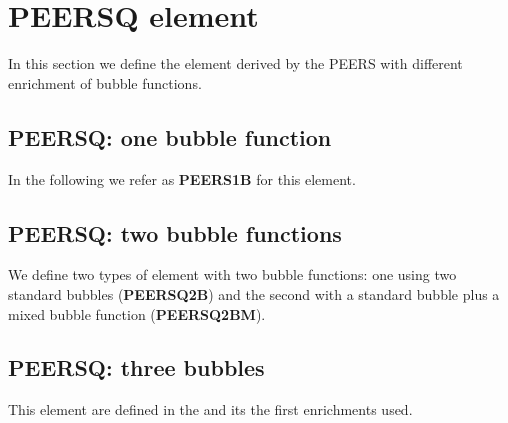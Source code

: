 \section{PEERSQ element}
In this section we define the element derived by the PEERS with different enrichment of bubble functions. 

\subsection{PEERSQ: one bubble function}
In the following we refer as \textbf{PEERS1B} for this element.


\subsection{PEERSQ: two bubble functions}
We define two types of element with two bubble functions: one using two standard bubbles (\textbf{PEERSQ2B}) and the second with a standard bubble plus a mixed bubble function (\textbf{PEERSQ2BM}).

\subsection{PEERSQ: three bubbles}
This element are defined in the \cite{Morley} and its the first enrichments used.